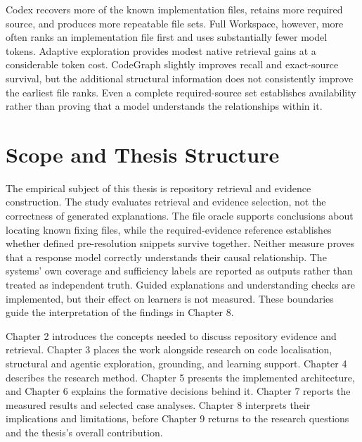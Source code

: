 Codex recovers more of the known implementation files, retains more required source, and produces more repeatable file sets. Full Workspace, however, more often ranks an implementation file first and uses substantially fewer model tokens. Adaptive exploration provides modest native retrieval gains at a considerable token cost. CodeGraph slightly improves recall and exact-source survival, but the additional structural information does not consistently improve the earliest file ranks. Even a complete required-source set establishes availability rather than proving that a model understands the relationships within it.

\section{Scope and Thesis Structure}\label{sec:scope-and-thesis-structure}

The empirical subject of this thesis is repository retrieval and evidence construction. The study evaluates retrieval and evidence selection, not the correctness of generated explanations. The file oracle supports conclusions about locating known fixing files, while the required-evidence reference establishes whether defined pre-resolution snippets survive together. Neither measure proves that a response model correctly understands their causal relationship. The systems' own coverage and sufficiency labels are reported as outputs rather than treated as independent truth. Guided explanations and understanding checks are implemented, but their effect on learners is not measured. These boundaries guide the interpretation of the findings in Chapter 8.

Chapter 2 introduces the concepts needed to discuss repository evidence and retrieval. Chapter 3 places the work alongside research on code localisation, structural and agentic exploration, grounding, and learning support. Chapter 4 describes the research method. Chapter 5 presents the implemented architecture, and Chapter 6 explains the formative decisions behind it. Chapter 7 reports the measured results and selected case analyses. Chapter 8 interprets their implications and limitations, before Chapter 9 returns to the research questions and the thesis's overall contribution.
